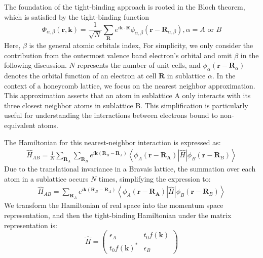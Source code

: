 The foundation of the tight-binding approach is rooted in the Bloch theorem, which is satisfied by the tight-binding function
\begin{equation}
\Phi_{\alpha,\beta}(\mathbf{r}, \mathbf{k})=\frac{1}{\sqrt{N}} \sum_{\mathbf{R}} e^{i \mathbf{k}
\cdot \mathbf{R}} \phi_{\alpha,\beta}\left(\mathbf{r}-\mathbf{R}_{\alpha,\beta}\right), \alpha=A \text { or } B
\label{eqn:Bloch}
\end{equation}
Here, $\beta$ is the general atomic orbitals index, 
For simplicity, we only consider the contribution from the outermost valence band electron's
orbital and omit $\beta$ in the following discussion. $N$ represents the number of unit cells, and $\phi_{\alpha}(\mathbf{r} - \mathbf{R}_{\alpha})$ denotes the orbital function of an electron at cell $\mathbf{R}$ in sublattice $\alpha$.
In the context of a honeycomb lattice, we focus on the nearest neighbor approximation. This approximation asserts that an atom in sublattice A only interacts with its three closest neighbor atoms in sublattice B. This simplification is particularly useful for understanding the interactions between electrons bound to non-equivalent atoms.

The Hamiltonian for this nearest-neighbor interaction is expressed as:
\begin{align}
\hat{H}_{A B}=\frac{1}{N} \sum_{\mathbf{R}_{A}} \sum_{\mathbf{R}_{B}} e^{i \mathbf{k}\left(\mathbf{R}_{B}-\mathbf{R}_{A}\right)}\left\langle\phi_{A}\left(\mathbf{r}-\mathbf{R}_{\mathbf{A}}\right)|\hat H| \phi_{B}\left(\mathbf{r}-\mathbf{R}_{B}\right)\right\rangle
\end{align}
Due to the translational invariance in a Bravais lattice, the summation over each atom in a sublattice occurs $N$ times, simplifying the expression to:
\begin{align}
\hat{H}_{A B}=\sum_{\mathbf{R}_{A}} e^{i \mathbf{k}\left(\mathbf{R}_{B}-\mathbf{R}_{A}\right)}\left\langle\phi_{A}\left(\mathbf{r}-\mathbf{R}_{\mathbf{A}}\right)|\hat{H}| \phi_{B}\left(\mathbf{r}-\mathbf{R}_{B}\right)\right\rangle
\end{align}
 We transform the Hamiltonian of real space into the momentum space representation, and then the
 tight-binding Hamiltonian under the matrix representation is:
\begin{equation}
\hat{H} =\left(\begin{array}{cc}
\epsilon_{A} & t_{0} f(\mathbf{k}) \\
t_{0} f(\mathbf{k})^{*} & \epsilon_{B}
\end{array}\right)
\label{eqn: TBh}
\end{equation}

